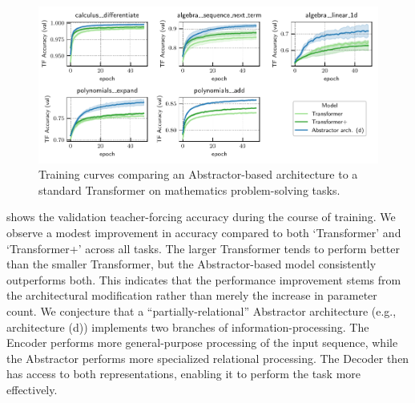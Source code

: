 \begin{figure}[t]
    \centering
    \includegraphics[width=\textwidth]{figures/experiments/math_training_curves.pdf}
    \caption{Training curves comparing an Abstractor-based architecture to a standard Transformer on mathematics problem-solving tasks.}\label{fig:math_training_curves}
\end{figure}

 shows the validation teacher-forcing accuracy during the course of training. We observe a modest improvement in accuracy compared to both `Transformer' and `Transformer+' across all tasks. The larger Transformer tends to perform better than the smaller Transformer, but the Abstractor-based model consistently outperforms both. This indicates that the performance improvement stems from the architectural modification rather than merely the increase in parameter count. We conjecture that a ``partially-relational'' Abstractor architecture (e.g., architecture (d)) implements two branches of information-processing. The Encoder performs more general-purpose processing of the input sequence, while the Abstractor performs more specialized relational processing. The Decoder then has access to both representations, enabling it to perform the task more effectively.

